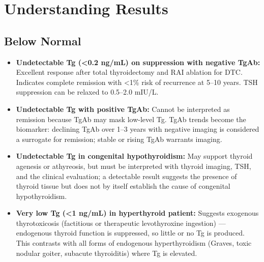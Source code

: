 \section*{Understanding Results}

\subsection*{Below Normal}
\begin{itemize}
  \item \textbf{Undetectable Tg (<0.2 ng/mL) on suppression with negative TgAb:} Excellent response after total thyroidectomy and RAI ablation for DTC. Indicates complete remission with <1\% risk of recurrence at 5--10 years. TSH suppression can be relaxed to 0.5--2.0 mIU/L.
  \item \textbf{Undetectable Tg with positive TgAb:} Cannot be interpreted as remission because TgAb may mask low-level Tg. TgAb trends become the biomarker: declining TgAb over 1--3 years with negative imaging is considered a surrogate for remission; stable or rising TgAb warrants imaging.
  \item \textbf{Undetectable Tg in congenital hypothyroidism:} May support thyroid agenesis or athyreosis, but must be interpreted with thyroid imaging, TSH, and the clinical evaluation; a detectable result suggests the presence of thyroid tissue but does not by itself establish the cause of congenital hypothyroidism.
  \item \textbf{Very low Tg (<1 ng/mL) in hyperthyroid patient:} Suggests exogenous thyrotoxicosis (factitious or therapeutic levothyroxine ingestion) --- endogenous thyroid function is suppressed, so little or no Tg is produced. This contrasts with all forms of endogenous hyperthyroidism (Graves, toxic nodular goiter, subacute thyroiditis) where Tg is elevated.
\end{itemize}

